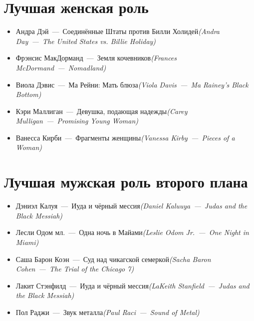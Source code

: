 \documentclass[a4paper,10pt]{article}
\begin{document}
\begin{multicols}{2}
\section{Лучшая женская роль}

\begin{itemize}
	\item Андра Дэй — Соединённые Штаты против Билли Холидей\newline\textit{(Andra Day — The United States vs. Billie Holiday)}
	\item Фрэнсис МакДорманд — Земля кочевников\newline\textit{(Frances McDormand — Nomadland)}
	\item Виола Дэвис — Ма Рейни: Мать блюза\newline\textit{(Viola Davis — Ma Rainey's Black Bottom)}
	\item Кэри Маллиган — Девушка, подающая надежды\newline\textit{(Carey Mulligan — Promising Young Woman)}
	\item Ванесса Кирби — Фрагменты женщины\newline\textit{(Vanessa Kirby — Pieces of a Woman)}
\end{itemize}

\section{Лучшая мужская роль второго плана}

\begin{itemize}
	\item Дэниэл Калуя — Иуда и чёрный мессия\newline\textit{(Daniel Kaluuya — Judas and the Black Messiah)}
	\item Лесли Одом мл. — Одна ночь в Майами\newline\textit{(Leslie Odom Jr. — One Night in Miami)}
	\item Саша Барон Коэн — Суд над чикагской семеркой\newline\textit{(Sacha Baron Cohen — The Trial of the Chicago 7)}
	\item Лакит Стэнфилд — Иуда и чёрный мессия\newline\textit{(LaKeith Stanfield — Judas and the Black Messiah)}
	\item Пол Раджи — Звук металла\newline\textit{(Paul Raci — Sound of Metal)}
\end{itemize}


\end{multicols}
\end{document}
